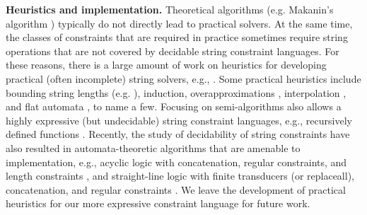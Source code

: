 


\smallskip
\noindent
\textbf{Heuristics and implementation.}
Theoretical algorithms
(e.g. Makanin's algorithm \cite{Makanin}) typically do not directly lead to 
practical solvers. At the same time, the classes of constraints that are 
required in practice sometimes require string operations that are not covered by
decidable string constraint languages.
For these reasons,
there is a large amount of work on heuristics for developing practical
(often incomplete) string solvers, e.g., 
\cite{BTV09,Berkeley-JavaScript,HAMPI,Stranger,YABI14,Abdulla14,fang-yu-circuits,Abdulla17,HJLRV18,S3,TCJ16,Z3-str,Z3-str2,cvc4,Saner,RVG12}.
Some practical heuristics include
bounding string lengths (e.g. \cite{HAMPI,Berkeley-JavaScript,BTV09}), 
induction, overapproximations \cite{Stranger,YABI14}, interpolation
\cite{Abdulla14}, and flat automata \cite{Abdulla17}, to name a few. 
Focusing on semi-algorithms also allows a highly expressive (but undecidable) 
string 
constraint languages, e.g., recursively defined functions \cite{S3,TCJ16}. 
Recently, the study of decidability of string constraints have also resulted in
automata-theoretic algorithms that are amenable to implementation, e.g.,
acyclic logic with concatenation, regular constraints, and length constraints 
\cite{Abdulla14}, and straight-line logic with finite transducers (or
replaceall), concatenation, and regular constraints 
\cite{HJLRV18,fang-yu-circuits,yan-tool}. 
We leave the development of practical heuristics for our more expressive 
constraint language for future work.

